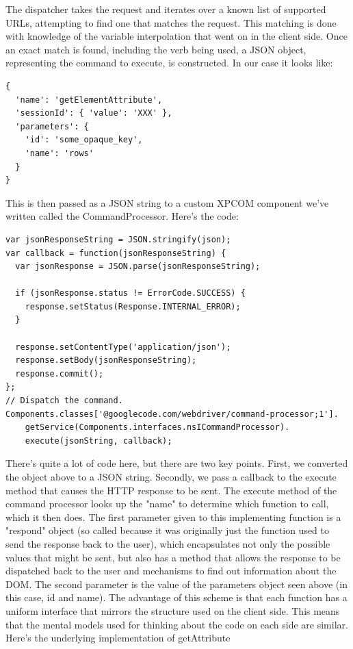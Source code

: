 \documentclass[12pt]{report}
\begin{document}
The dispatcher takes the request and iterates over a known list of supported URLs, attempting to find one that matches the request. This matching is done with knowledge of the variable interpolation that went on in the client side. Once an exact match is found, including the verb being used, a JSON object, representing the command to execute, is constructed. In our case it looks like:
\begin{verbatim}
{
  'name': 'getElementAttribute',
  'sessionId': { 'value': 'XXX' },
  'parameters': {
    'id': 'some_opaque_key',
    'name': 'rows'
  }
}

\end{verbatim}
This is then passed as a JSON string to a custom XPCOM component we've written called the CommandProcessor. Here's the code:
\begin{verbatim}
var jsonResponseString = JSON.stringify(json);
var callback = function(jsonResponseString) {
  var jsonResponse = JSON.parse(jsonResponseString);

  if (jsonResponse.status != ErrorCode.SUCCESS) {
    response.setStatus(Response.INTERNAL_ERROR);
  }

  response.setContentType('application/json');
  response.setBody(jsonResponseString);
  response.commit();
};
// Dispatch the command.
Components.classes['@googlecode.com/webdriver/command-processor;1'].
    getService(Components.interfaces.nsICommandProcessor).
    execute(jsonString, callback);

\end{verbatim}
There's quite a lot of code here, but there are two key points. First, we converted the object above to a JSON string. Secondly, we pass a callback to the execute method that causes the HTTP response to be sent.
The execute method of the command processor looks up the "name" to determine which function to call, which it then does. The first parameter given to this implementing function is a "respond" object (so called because it was originally just the function used to send the response back to the user), which encapsulates not only the possible values that might be sent, but also has a method that allows the response to be dispatched back to the user and mechanisms to find out information about the DOM. The second parameter is the value of the parameters object seen above (in this case, id and name). The advantage of this scheme is that each function has a uniform interface that mirrors the structure used on the client side. This means that the mental models used for thinking about the code on each side are similar. Here's the underlying implementation of getAttribute
\end{document}
